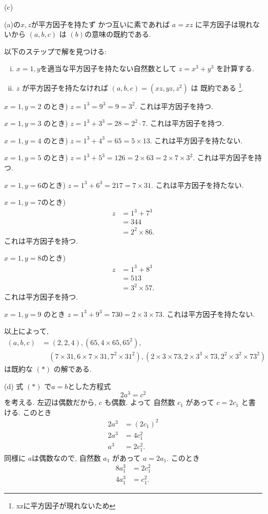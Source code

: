 \documentclass{jarticle}
\begin{document}
\noindent (c) %

(a)の$x, z$が平方因子を持たず かつ互いに素であれば $a = xz$ に平方因子は現れないから
$(a, b, c)$ は $(b)$の意味の既約である.

以下のステップで解を見つける:

\begin{enumerate}[(i)]
\item $x = 1, y$を適当な平方因子を持たない自然数として $z = x^3 + y^3$ を計算する.
\item $z$ が平方因子を持たなければ $(a, b, c) = (xz, yz, z^2)$ は 既約である
  \footnote{xzに平方因子が現れないため}.
\end{enumerate}

$x=1, y=2$ のとき) $z = 1^3 = 9^3 = 9 = 3^2$. これは平方因子を持つ.

$x=1, y=3$ のとき) $z = 1^3 + 3^3 = 28 = 2^2 \cdot 7$. これは平方因子を持つ.

$x=1, y=4$ のとき) $z = 1^3 + 4^3 = 65 = 5 \times 13$. これは平方因子を持たない.

$x=1, y=5$ のとき) $z = 1^3 + 5^3 = 126 = 2 \times 63 = 2 \times 7 \times 3^2$.
  これは平方因子を持つ.

$x=1, y=6$のとき) $z = 1^3 + 6^3 = 217 = 7 \times 31$. これは平方因子を持たない.

$x=1, y=7$のとき)
\begin{align*}
z
  &= 1^3 + 7^3 \\
  &= 344 \\
  &= 2^2 \times 86.
\end{align*}
これは平方因子を持つ.

$x = 1, y=8$のとき)
\begin{align*}
z
  &= 1^3 + 8^3 \\
  &= 513 \\
  &= 3^2 \times 57.
\end{align*}
これは平方因子を持つ.

$x = 1, y = 9$ のとき $z = 1^3 + 9^3 = 730 = 2 \times 3 \times 73$. これは平方因子を持たない.

以上によって,
\begin{align*}
(a, b, c)
  &= (2, 2, 4), (65, 4 \times 65, 65^2), \\
  & \quad (7 \times 31, 6 \times 7 \times 31, 7^2 \times 31^2),
      (2 \times 3 \times 73, 2 \times 3^3 \times 73, 2^2 \times 3^2 \times 73^2)
\end{align*}
は既約な $(\ast)$ の解である.

\noindent (d) %
式 $(\ast)$ で$a = b$とした方程式
\[
  2a^3 = c^2
\]
を考える.
左辺は偶数だから, $c$ も偶数. よって 自然数 $c_1$ があって $c = 2c_1$ と書ける.
このとき
\begin{align*}
2a^3 &= (2c_1)^2 \\
2a^3 &= 4c_1^2 \\
a^3 &= 2c_1^2.
\end{align*}
同様に $a$は偶数なので, 自然数 $a_1$ があって $a = 2a_1$.
このとき
\begin{align*}
  8a_1^3 &= 2c_1^2 \\
  4a_1^3 &= c_1^2.
\end{align*}
\end{document}
